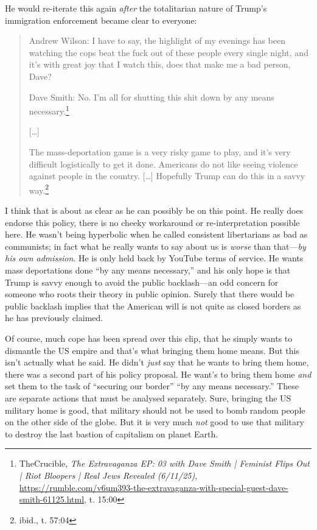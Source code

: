 \documentclass[11pt]{article}
\begin{document}
He would re-iterate this again \emph{after} the totalitarian nature of Trump's immigration enforcement became clear to everyone:
\begin{quote}
Andrew Wilson: I have to say, the highlight of my evenings has been watching the cops beat the fuck out of these people every single night, and it's with great joy that I watch this, does that make me a bad person, Dave?

Dave Smith: No. I'm all for shutting this shit down by any means necessary.\footnote{TheCrucible, \emph{The Extravaganza EP: 03 with Dave Smith | Feminist Flips Out | Riot Bloopers | Real Jews Revealed (6/11/25)}, \url{https://rumble.com/v6um393-the-extravaganza-with-special-guest-dave-smith-61125.html}, t. 15:00}

{[}\ldots{}]

The mass-deportation game is a very risky game to play, and it's very difficult logistically to get it done. Americans do not like seeing violence against people in the country. [\ldots{}] Hopefully Trump can do this in a savvy way.\footnote{ibid., t. 57:04}
\end{quote}

I think that is about as clear as he can possibly be on this point. He really does endorse this policy, there is no cheeky workaround or re-interpretation possible here. He wasn't being hyperbolic when he called consistent libertarians as bad as communists; in fact what he really wants to say about us is \emph{worse} than that---\emph{by his own admission}. He is only held back by YouTube terms of service. He wants mass deportations done ``by any means necessary,'' and his only hope is that Trump is savvy enough to avoid the public backlash---an odd concern for someone who roots their theory in public opinion. Surely that there would be public backlash implies that the American will is not quite as closed borders as he has previously claimed.

Of course, much cope has been spread over this clip, that he simply wants to dismantle the US empire and that's what bringing them home means. But this isn't actually what he said. He didn't \emph{just} say that he wants to bring them home, there was a second part of his policy proposal. He want's to bring them home \emph{and} set them to the task of ``securing our border'' ``by any means necessary.'' These are separate actions that must be analysed separately. Sure, bringing the US military home is good, that military should not be used to bomb random people on the other side of the globe. But it is very much \emph{not} good to use that military to destroy the last bastion of capitalism on planet Earth.
\end{document}
